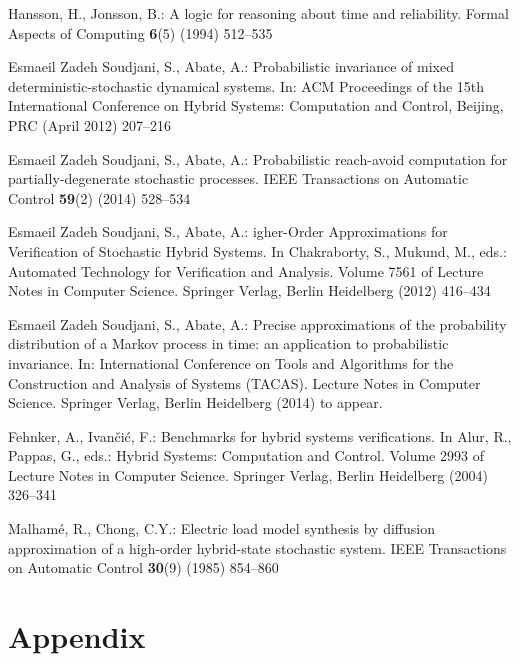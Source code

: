 \documentclass{llncs}
\begin{document}
\begin{thebibliography}{10}
Hansson, H., Jonsson, B.:
\newblock A logic for reasoning about time and reliability.
\newblock Formal Aspects of Computing \textbf{6}(5) (1994)  512--535

{Esmaeil Zadeh Soudjani}, S., Abate, A.:
\newblock Probabilistic invariance of mixed deterministic-stochastic dynamical
  systems.
\newblock In: {ACM} Proceedings of the 15th {I}nternational {C}onference on
  {H}ybrid {S}ystems: {C}omputation and {C}ontrol, Beijing, PRC (April 2012)
  207--216

{Esmaeil Zadeh Soudjani}, S., Abate, A.:
\newblock Probabilistic reach-avoid computation for partially-degenerate
  stochastic processes.
\newblock IEEE Transactions on Automatic Control \textbf{59}(2) (2014)
  528--534

{Esmaeil Zadeh Soudjani}, S., Abate, A.:
igher-{O}rder {A}pproximations for {V}erification of {S}tochastic
  {H}ybrid {S}ystems.
\newblock In Chakraborty, S., Mukund, M., eds.: Automated Technology for
  Verification and Analysis. Volume 7561 of Lecture Notes in Computer Science.
\newblock Springer Verlag, Berlin Heidelberg (2012)  416--434

{Esmaeil Zadeh Soudjani}, S., Abate, A.:
\newblock Precise approximations of the probability distribution of a {M}arkov
  process in time: an application to probabilistic invariance.
\newblock In: International Conference on Tools and Algorithms for the
  Construction and Analysis of Systems (TACAS). Lecture Notes in Computer
  Science.
\newblock Springer Verlag, Berlin Heidelberg (2014) to appear.

{Fehnker}, A., {Ivan\v ci\'c}, F.:
\newblock Benchmarks for hybrid systems verifications.
\newblock In Alur, R., Pappas, G., eds.: Hybrid Systems: Computation and
  Control. Volume 2993 of Lecture Notes in Computer Science.
\newblock Springer Verlag, Berlin Heidelberg (2004)  326--341

Malhamé, R., Chong, C.Y.:
\newblock Electric load model synthesis by diffusion approximation of a
  high-order hybrid-state stochastic system.
\newblock IEEE Transactions on Automatic Control \textbf{30}(9) (1985)
  854--860
\end{thebibliography}

\section*{Appendix} 
\end{document}
